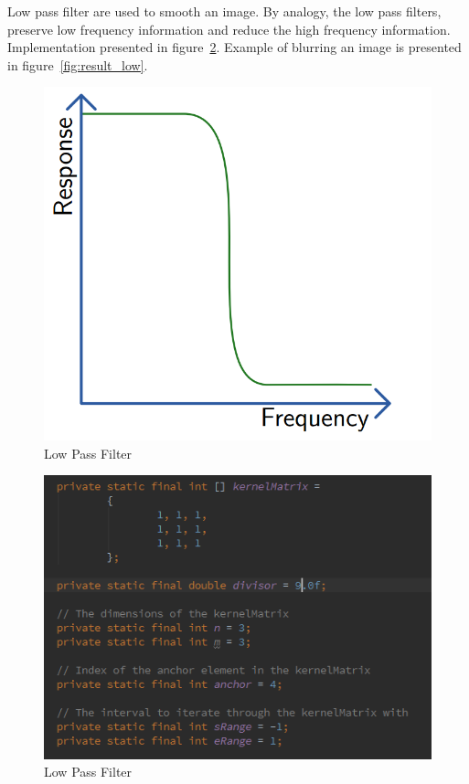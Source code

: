 \documentclass{article}
\begin{document}
Low pass filter are used to smooth an image. By analogy, the low pass filters, preserve low frequency information and reduce the high frequency information.
Implementation presented in figure~\ref{fig:alg_low_pass}. Example of blurring an image is presented in figure~\ref{fig:result_low}.


%
%
\begin{figure}[H]
\centering

  \includegraphics[width=0.5\linewidth]{res/low_pass_graph.png}
  
\caption{Low Pass Filter}
\label{fig:low_pass_graph}
\end{figure}


%
%
\begin{figure}[H]
\centering

  \includegraphics[width=0.9\linewidth]{res/algorithms/low_pass.png}
  
\caption{Low Pass Filter}
\label{fig:alg_low_pass}
\end{figure}
\end{document}
